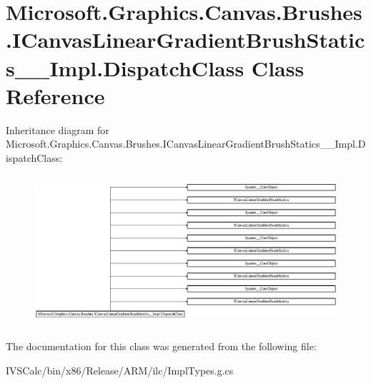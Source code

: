 \hypertarget{class_microsoft_1_1_graphics_1_1_canvas_1_1_brushes_1_1_i_canvas_linear_gradient_brush_statics_____impl_1_1_dispatch_class}{}\section{Microsoft.\+Graphics.\+Canvas.\+Brushes.\+I\+Canvas\+Linear\+Gradient\+Brush\+Statics\+\_\+\+\_\+\+Impl.\+Dispatch\+Class Class Reference}
\label{class_microsoft_1_1_graphics_1_1_canvas_1_1_brushes_1_1_i_canvas_linear_gradient_brush_statics_____impl_1_1_dispatch_class}
Inheritance diagram for Microsoft.\+Graphics.\+Canvas.\+Brushes.\+I\+Canvas\+Linear\+Gradient\+Brush\+Statics\+\_\+\+\_\+\+Impl.\+Dispatch\+Class\+:\begin{figure}[H]
\begin{center}
\leavevmode
\includegraphics[height=5.610200cm]{class_microsoft_1_1_graphics_1_1_canvas_1_1_brushes_1_1_i_canvas_linear_gradient_brush_statics_____impl_1_1_dispatch_class}
\end{center}
\end{figure}


The documentation for this class was generated from the following file\+:\begin{DoxyCompactItemize}
\item 
I\+V\+S\+Calc/bin/x86/\+Release/\+A\+R\+M/ilc/Impl\+Types.\+g.\+cs\end{DoxyCompactItemize}
